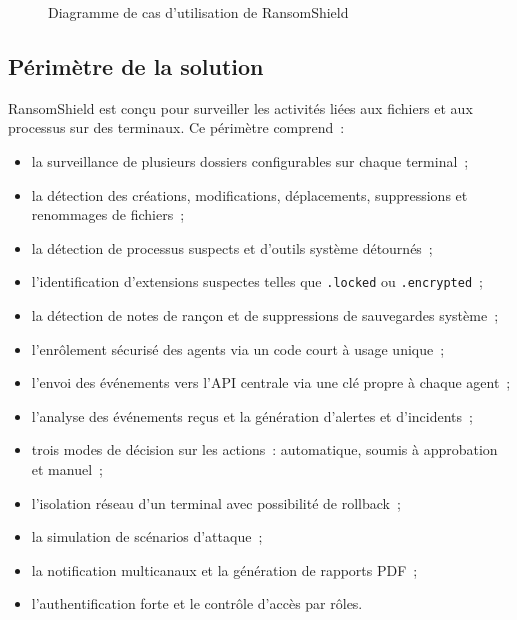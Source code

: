 \begin{figure}[htbp]
\caption{Diagramme de cas d'utilisation de RansomShield}
\label{fig:use-case-ransomshield}
\end{figure}

\subsection{Périmètre de la solution}

RansomShield est conçu pour surveiller les activités liées aux fichiers et aux processus sur des terminaux. Ce périmètre comprend~:

\begin{itemize}
    \item la surveillance de plusieurs dossiers configurables sur chaque terminal~;
    \item la détection des créations, modifications, déplacements, suppressions et renommages de fichiers~;
    \item la détection de processus suspects et d'outils système détournés~;
    \item l'identification d'extensions suspectes telles que \texttt{.locked} ou \texttt{.encrypted}~;
    \item la détection de notes de rançon et de suppressions de sauvegardes système~;
    \item l'enrôlement sécurisé des agents via un code court à usage unique~;
    \item l'envoi des événements vers l'API centrale via une clé propre à chaque agent~;
    \item l'analyse des événements reçus et la génération d'alertes et d'incidents~;
    \item trois modes de décision sur les actions~: automatique, soumis à approbation et manuel~;
    \item l'isolation réseau d'un terminal avec possibilité de rollback~;
    \item la simulation de scénarios d'attaque~;
    \item la notification multicanaux et la génération de rapports PDF~;
    \item l'authentification forte et le contrôle d'accès par rôles.
\end{itemize}

